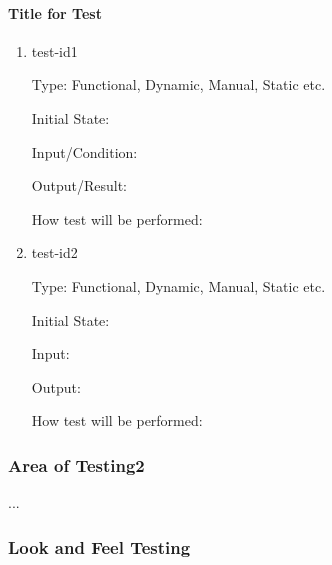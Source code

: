 \documentclass[12pt, titlepage]{article}
\begin{document}
	\paragraph{Title for Test}
	
	\begin{enumerate}
		
		\item{test-id1\\}
		
		Type: Functional, Dynamic, Manual, Static etc.
		
		Initial State: 
		
		Input/Condition: 
		
		Output/Result: 
		
		How test will be performed: 
		
		\item{test-id2\\}
		
		Type: Functional, Dynamic, Manual, Static etc.
		
		Initial State: 
		
		Input: 
		
		Output: 
		
		How test will be performed: 
		
	\end{enumerate}
	
	\subsubsection{Area of Testing2}
	
	...
	
	\subsubsection{Look and Feel Testing}
	
	
\end{document}
